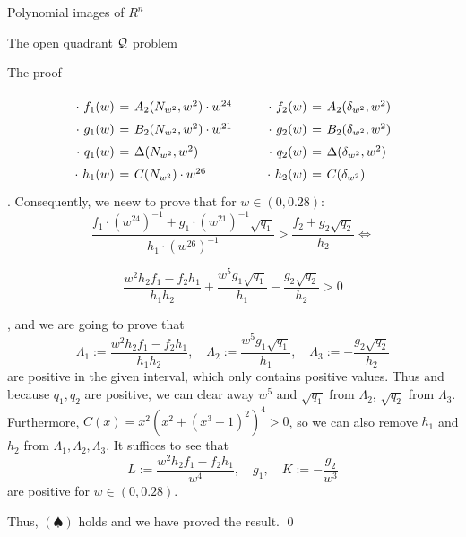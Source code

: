 \documentclass[11pt, a4paper, english, twoside, notitlepage]{report}
\begin{document}
\begin{chapter}{Polynomial images of $R^n$}
\begin{section}{The open quadrant $\mathcal{Q}$ problem}
\begin{subsection}{The proof}
\begin{Proof}
			$$
			\arraycolsep=2pt\def\arraystretch{1.5}
			\begin{array}{rclcrcl}
				\cdot\ f_1(w)&=&A_2(N_{w^2},w^2)\cdot w^{24}& \qquad &\cdot\ f_2(w)&=& A_2(\delta_{w^2},w^2)\\
				\cdot\ g_1(w)&=&B_2(N_{w^2},w^2)\cdot w^{21}& \qquad &\cdot\ g_2(w)&=&B_2(\delta_{w^2},w^2)\\
				\cdot\ q_1(w)&=&\Delta(N_{w^2},w^2)& \qquad &\cdot\ q_2(w)&=&\Delta(\delta_{w^2},w^2)\\
				\cdot\ h_1(w)&=&C(N_{w^2})\cdot w^{26}& \qquad &\cdot\ h_2(w)&=&C(\delta_{w^2})
			\end{array}
			$$
			. Consequently, we neew to prove that for $w \in (0, 0.28)$:
			$$
			\frac{f_1 \cdot (w^{24})^{-1} + g_1\cdot (w^{21})^{-1}\sqrt{q_1}}{h_1 \cdot (w^{26})^{-1}}
			> 
			\frac{f_2+g_2\sqrt{q_2}}{h_2} \iff
			$$

			$$
			\frac{w^2h_2f_1-f_2h_1}{h_1h_2}+\frac{w^5g_1\sqrt{q_1}}{h_1}-\frac{g_2\sqrt{q_2}}{h_2}>0
			$$

			, and we are going to prove that 
			$$
			\Lambda_1 := \frac{w^2h_2f_1-f_2h_1}{h_1h_2},\quad\Lambda_2 := \frac{w^5g_1\sqrt{q_1}}{h_1},\quad \Lambda_3 := -\frac{g_2\sqrt{q_2}}{h_2}
			$$
			are positive in the given interval, which only contains positive values. Thus and because $q_1, q_2$ are positive, we can clear away $w^5$ and $\sqrt{q_1}$ from $\Lambda_2$, $\sqrt{q_2}$ from $\Lambda_3$. Furthermore, $C(x) = x^2(x^2+(x^3+1)^2)^4 > 0$, so we can also remove $h_1$ and $h_2$ from $\Lambda_1, \Lambda_2, \Lambda_3$. It suffices to see that
			$$
			L:=\frac{w^2h_2f_1-f_2h_1}{w^4},\quad g_1,\quad K:=-\frac{g_2}{w^3}
			$$ 
			are positive for $w \in (0,0.28)$. 
			
			
			Thus, $(\spadesuit)$ holds and we have proved the result. \qed


		\end{Proof}
		
	\end{subsection}
	
\end{section}


\end{chapter}
\end{document}
